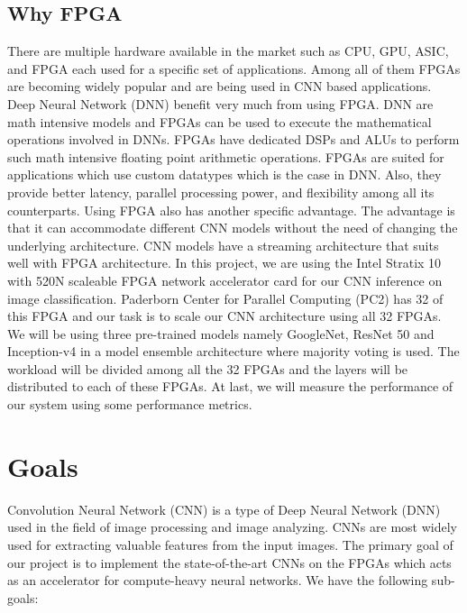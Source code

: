 \documentclass[titlepage]{report}
\begin{document}
\section{Why FPGA}
There are multiple hardware available in the market such as CPU, GPU, ASIC, and FPGA each used for a specific set of applications. Among all of them FPGAs are becoming widely popular and are being used in CNN based applications. Deep Neural Network (DNN) benefit very much from using FPGA. DNN are math intensive models and FPGAs can be used to execute the mathematical operations involved in DNNs. FPGAs have dedicated DSPs and ALUs to perform such math intensive floating point arithmetic operations. FPGAs are suited for applications which use custom datatypes which is the case in DNN. Also, they provide better latency, parallel processing power, and flexibility among all its counterparts. Using FPGA also has another specific advantage. The advantage is that it can accommodate different CNN models without the need of changing the underlying architecture. CNN models have a streaming architecture that suits well with FPGA architecture.
In this project, we are using the Intel Stratix 10 with 520N scaleable FPGA network accelerator card for our CNN inference on image classification. Paderborn Center for Parallel Computing (PC2) has 32 of this FPGA and our task is to scale our CNN architecture using all 32 FPGAs. We will be using three pre-trained models namely GoogleNet, ResNet 50 and Inception-v4 in a model ensemble architecture where majority voting is used. The workload will be divided among all the 32 FPGAs and the layers will be distributed to each of these FPGAs. At last, we will measure the performance of our system using some performance metrics.


\chapter{Goals}
Convolution Neural Network (CNN) is a type of Deep Neural Network (DNN) used in the field of image processing and image analyzing. CNNs are most widely used for extracting valuable features from the input images. The primary goal of our project is to implement the state-of-the-art CNNs on the FPGAs which acts as an accelerator for compute-heavy neural networks. We have the following sub-goals:
\end{document}
